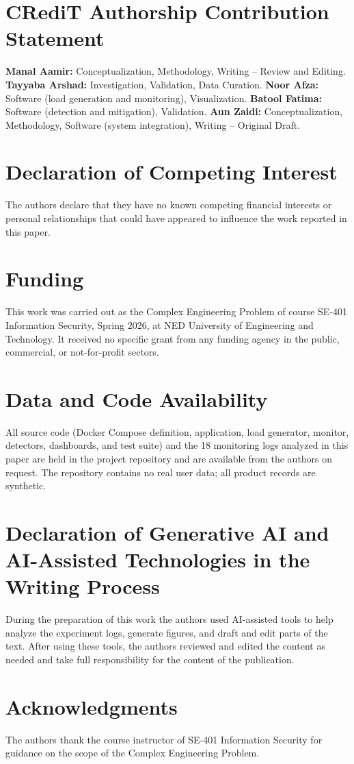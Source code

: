 
\section*{CRediT Authorship Contribution Statement}
\textbf{Manal Aamir:} Conceptualization, Methodology, Writing -- Review and Editing.
\textbf{Tayyaba Arshad:} Investigation, Validation, Data Curation.
\textbf{Noor Afza:} Software (load generation and monitoring), Visualization.
\textbf{Batool Fatima:} Software (detection and mitigation), Validation.
\textbf{Aun Zaidi:} Conceptualization, Methodology, Software (system integration),
Writing -- Original Draft.

\section*{Declaration of Competing Interest}
The authors declare that they have no known competing financial interests or personal
relationships that could have appeared to influence the work reported in this paper.

\section*{Funding}
This work was carried out as the Complex Engineering Problem of course SE-401
Information Security, Spring 2026, at NED University of Engineering and Technology. It
received no specific grant from any funding agency in the public, commercial, or
not-for-profit sectors.

\section*{Data and Code Availability}
All source code (Docker Compose definition, application, load generator, monitor,
detectors, dashboards, and test suite) and the 18 monitoring logs analyzed in this paper
are held in the project repository and are available from the authors on request. The
repository contains no real user data; all product records are synthetic.

\section*{Declaration of Generative AI and AI-Assisted Technologies in the Writing Process}
During the preparation of this work the authors used AI-assisted tools to help analyze
the experiment logs, generate figures, and draft and edit parts of the text. After
using these tools, the authors reviewed and edited the content as needed and take full
responsibility for the content of the publication.

\section*{Acknowledgments}
The authors thank the course instructor of SE-401 Information Security for guidance on
the scope of the Complex Engineering Problem.
